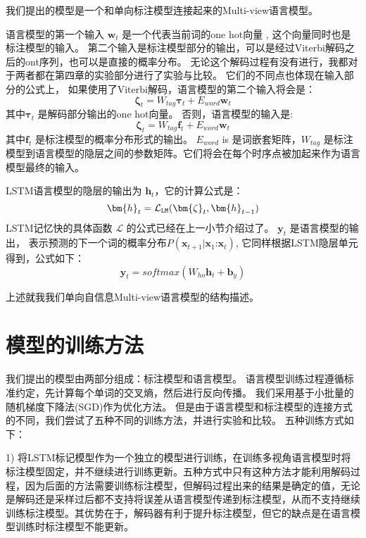 我们提出的模型是一个和单向标注模型连接起来的Multi-view语言模型。

语言模型的第一个输入 $\bm{w}_t$ 是一个代表当前词的one hot向量 , 这个向量同时也是标注模型的输入。
第二个输入是标注模型部分的输出，可以是经过Viterbi解码之后的ont序列，也可以是直接的概率分布。
无论这个解码过程有没有进行，我都对于两者都在第四章的实验部分进行了实验与比较。
它们的不同点也体现在输入部分的公式上，
如果使用了Viterbi解码，语言模型的第二个输入将会是：
	\begin{equation}
\bm{\zeta}_t=W_{tag}\bm{\tau}_t + E_{word}\bm{w}_t 
	\end{equation}
其中$\bm{\tau}_t$ 是解码部分输出的one hot向量。
否则，语言模型的输入是:
	\begin{equation}
\bm{\zeta}_t=W_{tag}\bm{f}_t +  E_{word}\bm{w}_t 
	\end{equation} 
其中$\bm{f}_t$ 是标注模型的概率分布形式的输出。
$E_{word}$ is 是词嵌套矩阵，$W_{tag}$ 是标注模型到语言模型的隐层之间的参数矩阵。它们将会在每个时序点被加起来作为语言模型最终的输入。



LSTM语言模型的隐层的输出为 $\bm{h}_t$，它的计算公式是： 
	\begin{equation}
    \bm{h}_t = \mathcal{L}_{\tt{LM}}(\bm{\zeta}_t,\bm{h}_{t-1})
	\end{equation}
LSTM记忆快的具体函数 $\mathcal{L}$ 的公式已经在上一小节介绍过了。
$\bm{y}_{t}$ 是语言模型的输出，
表示预测的下一个词的概率分布$P(\bm{x}_{t+1}|\bm{x}_1\mathord{:}\bm{x}_t)$, 
它同样根据LSTM隐层单元得到，公式如下： 
	\begin{equation}
    \bm{y}_{t} = softmax(W_{ho}\bm{h}_{t}+\bm{b}_y)
	\end{equation}	
    
上述就我我们单向自信息Multi-view语言模型的结构描述。
    
\section{模型的训练方法}
我们提出的模型由两部分组成：标注模型和语言模型。
语言模型训练过程遵循标准约定，先计算每个单词的交叉熵，然后进行反向传播。
我们采用基于小批量的随机梯度下降法(SGD)作为优化方法。
但是由于语言模型和标注模型的连接方式的不同，我们尝试了五种不同的训练方法，并进行实验和比较。
五种训练方式如下：

1) 将LSTM标记模型作为一个独立的模型进行训练，在训练多视角语言模型时将标注模型固定，并不继续进行训练更新。五种方式中只有这种方法才能利用解码过程，因为后面的方法需要训练标注模型，但解码过程出来的结果是确定的值，无论是解码还是采样过后都不支持将误差从语言模型传递到标注模型，从而不支持继续训练标注模型。其优势在于，解码器有利于提升标注模型，但它的缺点是在语言模型训练时标注模型不能更新。

